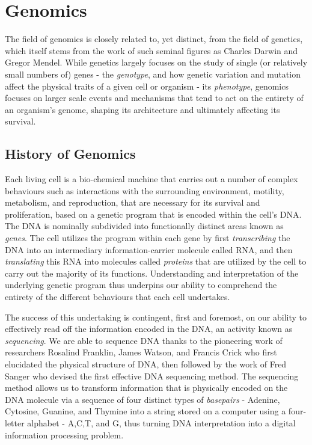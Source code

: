 \section{Genomics}
The field of genomics is closely related to, yet distinct, from the field of genetics, which itself stems from the work of such seminal figures as Charles Darwin\autocite{originofspecies} and Gregor Mendel\autocite{mendel1865}. While genetics largely focuses on the study of single (or relatively small numbers of) genes - the \emph{genotype}, and how genetic variation and mutation affect the physical traits of a given cell or organism - its \emph{phenotype}, genomics focuses on larger scale events and mechanisms that tend to act on the entirety of an organism's genome, shaping its architecture and ultimately affecting its survival.

\subsection{History of Genomics}
Each living cell is a bio-chemical machine that carries out a number of complex behaviours such as interactions with the surrounding environment, motility, metabolism, and reproduction, that are necessary for its survival and proliferation, based on a genetic program that is encoded within the cell's DNA. The DNA is nominally subdivided into functionally distinct areas known as \emph{genes}. The cell utilizes the program within each gene by first \emph{transcribing} the DNA into an intermediary information-carrier molecule called RNA, and then \emph{translating} this RNA into molecules called \emph{proteins} that are utilized by the cell to carry out the majority of its functions. Understanding and interpretation of the underlying genetic program thus underpins our ability to comprehend the entirety of the different behaviours that each cell undertakes.

The success of this undertaking is contingent, first and foremost, on our ability to effectively read off the information encoded in the DNA, an activity known as \emph{sequencing}. We are able to sequence DNA thanks to the pioneering work of researchers Rosalind Franklin\autocite{franklin1953molecular}, James Watson, and Francis Crick\autocite{watson1953molecular} who first elucidated the physical structure of DNA, then followed by the work of Fred Sanger\autocite{sanger1977dna,sanger1975rapid} who devised the first effective DNA sequencing method. The sequencing method allows us to transform information that is physically encoded on the DNA molecule via a sequence of four distinct types of \emph{basepairs} - Adenine, Cytosine, Guanine, and Thymine into a string stored on a computer using a four-letter alphabet - A,C,T, and G, thus turning DNA interpretation into a digital information processing problem.

